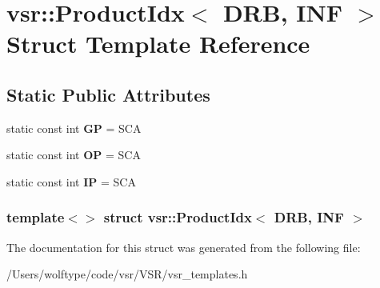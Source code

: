 \hypertarget{structvsr_1_1_product_idx_3_01_d_r_b_00_01_i_n_f_01_4}{\section{vsr\-:\-:Product\-Idx$<$ D\-R\-B, I\-N\-F $>$ Struct Template Reference}
\label{structvsr_1_1_product_idx_3_01_d_r_b_00_01_i_n_f_01_4}
}
\subsection*{Static Public Attributes}
\begin{DoxyCompactItemize}
\item 
\hypertarget{structvsr_1_1_product_idx_3_01_d_r_b_00_01_i_n_f_01_4_a686d7ec829238c48568947fd46d5def3}{static const int {\bfseries G\-P} = S\-C\-A}\label{structvsr_1_1_product_idx_3_01_d_r_b_00_01_i_n_f_01_4_a686d7ec829238c48568947fd46d5def3}

\item 
\hypertarget{structvsr_1_1_product_idx_3_01_d_r_b_00_01_i_n_f_01_4_a8c37be2700760d533a7c07290d9293b7}{static const int {\bfseries O\-P} = S\-C\-A}\label{structvsr_1_1_product_idx_3_01_d_r_b_00_01_i_n_f_01_4_a8c37be2700760d533a7c07290d9293b7}

\item 
\hypertarget{structvsr_1_1_product_idx_3_01_d_r_b_00_01_i_n_f_01_4_a8d6db81158f15a67726dc99ab7baca2f}{static const int {\bfseries I\-P} = S\-C\-A}\label{structvsr_1_1_product_idx_3_01_d_r_b_00_01_i_n_f_01_4_a8d6db81158f15a67726dc99ab7baca2f}

\end{DoxyCompactItemize}
\subsubsection*{template$<$$>$ struct vsr\-::\-Product\-Idx$<$ D\-R\-B, I\-N\-F $>$}



The documentation for this struct was generated from the following file\-:\begin{DoxyCompactItemize}
\item 
/\-Users/wolftype/code/vsr/\-V\-S\-R/vsr\-\_\-templates.\-h\end{DoxyCompactItemize}
